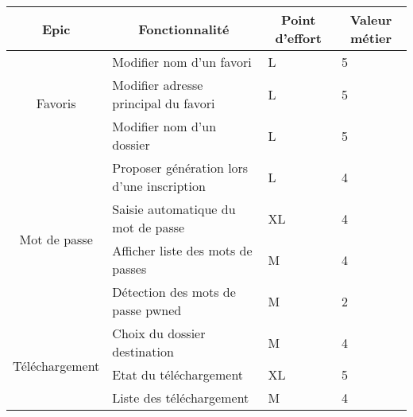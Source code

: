 \documentclass[10pt,a4paper]{article}
\begin{document}
\begin{table}[h]
\begin{tabular}{|c|l|l|l|}
\hline
\textbf{Epic}            & \multicolumn{1}{c|}{\textbf{Fonctionnalité}} & \multicolumn{1}{c|}{\textbf{Point d'effort}} & \multicolumn{1}{c|}{\textbf{Valeur métier}} \\ \hline
\multirow{3}{*}{Favoris} & Modifier nom d'un favori                     & L                                            & 5 \\ \cline{2-4} 
                         & Modifier adresse principal du favori         & L                                            & 5                                           \\ \cline{2-4} 
                         & Modifier nom d'un dossier                    & L                                            & 5                                           \\ \hline
\multirow{4}{*}{Mot de passe}           & Proposer génération lors d'une inscription   & L                                            & 4                                          \\ \cline{2-4} 
                                        & Saisie automatique du mot de passe           & XL                                           & 4                                           \\ \cline{2-4} 
                                        & Afficher liste des mots de passes            & M                                            & 4                                           \\ \cline{2-4} 
                                        & Détection des mots de passe pwned            & M                                            & 2                                           \\ \hline
\multirow{3}{*}{Téléchargement}         & Choix du dossier destination                 & M                                            & 4                                           \\ \cline{2-4} 
                                        & Etat du téléchargement                       & XL                                           & 5                                           \\ \cline{2-4} 
                                        & Liste des téléchargement                     & M                                            & 4                                           \\ \hline
\end{tabular}
\end{table}
\end{document}
